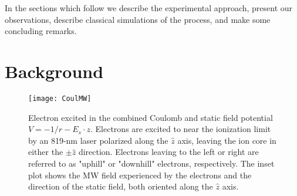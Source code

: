 \documentclass[aps,pra,preprint,groupedaddress]{revtex4-1}
\begin{document}
In the sections which follow we describe the experimental approach, present our observations, describe classical simulations of the process, and make some concluding remarks.


\section{\label{sec:back} Background}

\begin{figure}
	\texttt{[image: CoulMW]}
	\caption{Electron excited in the combined Coulomb and static field potential $V = -1/r - E_s \cdot z$. Electrons are excited to near the ionization limit by an 819-nm laser polarized along the $\hat{z}$ axis, leaving the ion core in either the $\pm \hat{z}$ direction. Electrons leaving to the left or right are referred to as "uphill" or "downhill" electrons, respectively. The inset plot shows the MW field experienced by the electrons and the direction of the static field, both oriented along the $\hat{z}$ axis.}
	\label{fig:CoulMW}
\end{figure}







\end{document}
